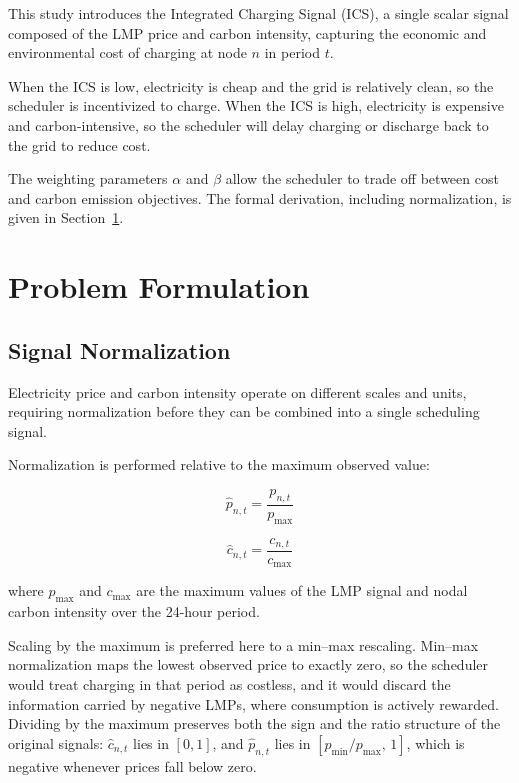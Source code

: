 \documentclass[sustainability,article,submit,moreauthors,pdftex]{Definitions/mdpi}
\begin{document}
This study introduces the Integrated Charging Signal (ICS), a single scalar signal composed of the LMP price and carbon intensity, capturing the economic and environmental cost of charging at node $n$ in period $t$.

When the ICS is low, electricity is cheap and the grid is relatively clean, so the scheduler is incentivized to charge. When the ICS is high, electricity is expensive and carbon-intensive, so the scheduler will delay charging or discharge back to the grid to reduce cost.

The weighting parameters $\alpha$ and $\beta$ allow the scheduler to trade off between cost and carbon emission objectives. The formal derivation, including normalization, is given in Section~\ref{sec:formulation}.

\section{Problem Formulation}
\label{sec:formulation}

\subsection{Signal Normalization}

Electricity price and carbon intensity operate on different scales and units, requiring normalization before they can be combined into a single scheduling signal.

Normalization is performed relative to the maximum observed value:

\begin{equation}
\hat{p}_{n,t}
=
\frac{p_{n,t}}{p_{\max}}
\label{eq:price_norm}
\end{equation}

\begin{equation}
\hat{c}_{n,t}
=
\frac{c_{n,t}}{c_{\max}}
\label{eq:carbon_norm}
\end{equation}

where $p_{\max}$ and $c_{\max}$ are the maximum values of the LMP signal and nodal carbon intensity over the 24-hour period.

Scaling by the maximum is preferred here to a min--max rescaling. Min--max normalization maps the lowest observed price to exactly zero, so the scheduler would treat charging in that period as costless, and it would discard the information carried by negative LMPs, where consumption is actively rewarded. Dividing by the maximum preserves both the sign and the ratio structure of the original signals: $\hat{c}_{n,t}$ lies in $[0,1]$, and $\hat{p}_{n,t}$ lies in $[p_{\min}/p_{\max},\,1]$, which is negative whenever prices fall below zero.
\end{document}
